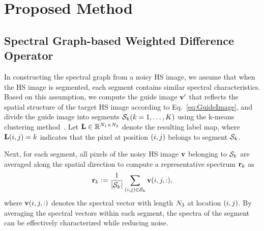 \section{Proposed Method}
\label{sec:ProposedMethod}



\subsection{Spectral Graph-based Weighted Difference Operator}
\label{subsec:WeightedSpectralDiff}

In constructing the spectral graph from a noisy HS image, we assume that when the HS image is segmented, each segment contains similar spectral characteristics. 
Based on this assumption, we compute the guide image $\mathbf{v}{'}$ that reflects the spatial structure of the target HS image according to Eq.~\eqref{eq:GuideImage}, and divide the guide image into segments $\mathcal{S}_{k} (k = 1, \dots, K)$ using the k-means clustering method~\cite{Arthur2006kmeans}. %
Let $\mathbf{L} \in \mathbb{R}^{N_{1} \times N_{2}}$ denote the resulting label map, where $\mathbf{L}(i, j) = k$ indicates that the pixel at position $(i, j)$ belongs to segment $\mathcal{S}_{k}$.

Next, for each segment, all pixels of the noisy HS image $\mathbf{v}$ belonging to $\mathcal{S}_{k}$ are averaged along the spatial direction to compute a representative spectrum $\mathbf{r}_{k}$ as
\begin{equation}
    \label{eq:SpectrumRep}
    \mathbf{r}_{k} := \frac{1}{|\mathcal{S}_{k}|} \sum_{(i, j) \in \mathcal{S}_{k}} \mathbf{v}(i, j, :),
\end{equation}
where $\mathbf{v}(i, j, :)$ denotes the spectral vector with length $N_{3}$ at location $(i, j)$.
By averaging the spectral vectors within each segment, the spectra of the segment can be effectively characterized while reducing noise.

